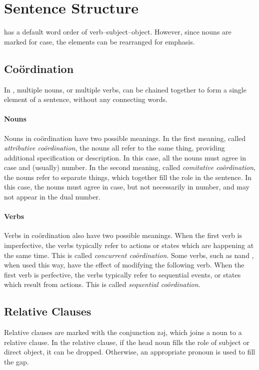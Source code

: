 \section{Sentence Structure}
\Langname{} has a default word order of verb--subject--object. However, since
nouns are marked for case, the elements can be rearranged for emphasis.

\subsection{Coördination}
In \Langname, multiple nouns, or multiple verbs, can be chained together to
form a single element of a sentence, without any connecting words.

\paragraph{Nouns} Nouns in coördination have two possible meanings. In the
first meaning, called \emph{attributive coördination}, the nouns all refer
to the same thing, providing additional specification or description. In this
case, all the nouns must agree in case and (usually) number. In the second
meaning, called \emph{comitative coördination}, the nouns refer to separate
things, which together fill the role in the sentence.  In this case, the nouns
must agree in case, but not necessarily in number, and may not appear in the
dual number.

\paragraph{Verbs} Verbs in coördination also have two possible meanings. When
the first verb is imperfective, the verbs typically refer to actions or states
which are happening at the same time. This is called \emph{concurrent
    coördination}. Some verbs, such as {\ll nand} , when used
this way, have the effect of modifying the following verb.  When the first verb
is perfective, the verbs typically refer to sequential events, or states which
result from actions. This is called \emph{sequential coördination}.

\subsection{Relative Clauses}
Relative clauses are marked with the conjunction {\ll zəj}, which joins a noun
to a relative clause. In the relative clause, if the head noun fills the role
of subject or direct object, it can be dropped. Otherwise, an appropriate
pronoun is used to fill the gap.

